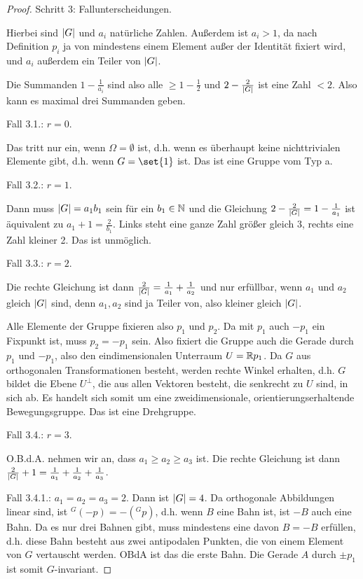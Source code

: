 \begin{proof}
\medbreak
Schritt 3: Fallunterscheidungen.

Hierbei sind $\lvert G\rvert$ und $a_i$ natürliche Zahlen. Außerdem ist $a_i>1$, da nach Definition $p_i$ ja von mindestens einem Element außer der Identität fixiert wird, und $a_i$ außerdem ein Teiler von $\lvert G\rvert$.

Die Summanden $1-\frac{1}{a_i}$ sind also alle $\geq 1-\tfrac{1}{2}$ und $2-\frac{2}{\lvert G\rvert}$ ist eine Zahl $<2$. Also kann es maximal drei Summanden geben.

\smallbreak
Fall 3.1.: $r=0$.

Das tritt nur ein, wenn $\Omega=\emptyset$ ist, d.h. wenn es überhaupt keine nichttrivialen Elemente gibt, d.h. wenn $G=\set{1}$ ist. Das ist eine Gruppe vom Typ a.

\smallbreak
Fall 3.2.: $r=1$.

Dann muss $\lvert G\rvert=a_1b_1$ sein für ein $b_1\in\mathbb{N}$ und die Gleichung $2-\frac{2}{\lvert G\rvert} = 1-\frac{1}{a_1}$ ist äquivalent zu $a_1+1 = \frac{2}{b_1}$. Links steht eine ganze Zahl größer gleich $3$, rechts eine Zahl kleiner 2. Das ist unmöglich.

\smallbreak
Fall 3.3.: $r=2$.

Die rechte Gleichung ist dann $\frac{2}{\lvert G\rvert} = \frac{1}{a_1} + \frac{1}{a_2}$ und  nur erfüllbar, wenn $a_1$ und $a_2$ gleich $\lvert G\rvert$ sind, denn $a_1,a_2$ sind ja Teiler von, also kleiner gleich $\lvert G\rvert$.

Alle Elemente der Gruppe fixieren also $p_1$ und $p_2$. Da mit $p_1$ auch $-p_1$ ein Fixpunkt ist, muss $p_2=-p_1$ sein. Also fixiert die Gruppe auch die Gerade durch $p_1$ und $-p_1$, also den eindimensionalen Unterraum $U=\mathbb{R} p_1$. Da $G$ aus orthogonalen Transformationen besteht, werden rechte Winkel erhalten, d.h. $G$ bildet die Ebene $U^\perp$, die aus allen Vektoren besteht, die senkrecht zu $U$ sind, in sich ab. Es handelt sich somit um eine zweidimensionale, orientierungserhaltende Bewegungsgruppe. Das ist eine Drehgruppe.

\smallbreak
Fall 3.4.: $r=3$.

O.B.d.A. nehmen wir an, dass $a_1\geq a_2\geq a_3$ ist. Die rechte Gleichung ist dann $\frac{2}{\lvert G\rvert}+1=\frac{1}{a_1}+\frac{1}{a_2}+\frac{1}{a_3}$.

Fall 3.4.1.: $a_1=a_2=a_3=2$. Dann ist $\lvert G\rvert=4$. Da orthogonale Abbildungen linear sind, ist ${^G(-p)} = -(^G p)$, d.h. wenn $B$ eine Bahn ist, ist $-B$ auch eine Bahn. Da es nur drei Bahnen gibt, muss mindestens eine davon $B=-B$ erfüllen, d.h. diese Bahn besteht aus zwei antipodalen Punkten, die von einem Element von $G$ vertauscht werden. OBdA ist das die erste Bahn. Die Gerade $A$ durch $\pm p_1$ ist somit $G$-invariant.


\end{proof}

